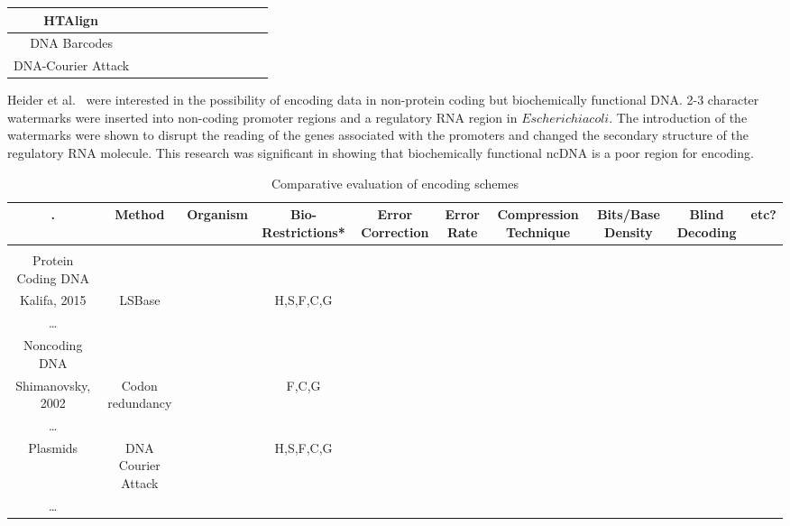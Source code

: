 \documentclass[USenglish,oneside,twocolumn]{article}
\begin{document}
\begin{table}[h]
{\begin{tabular}{|c|c|c|c|c|c|c|c|c|c|c|}
		HTAlign~\cite{HB2011IEEEICOBAB}  &  &  &\centering{$\CIRCLE$}  &\centering{$\CIRCLE$}  &  &\centering{$\Circle$}  &\centering{$\Circle$}  &  &  &\\ \hline
		DNA Barcodes~\cite{KS2015BMCB}  &\centering{$\CIRCLE$}  &  &\centering{$\CIRCLE$}  &\centering{$\CIRCLE$}  &  &\centering{$\CIRCLE$}  &\centering{$\CIRCLE$}  &  &  &\\ \hline
		DNA-Courier Attack~\cite{CLY2015SAPW}  &  &  &\centering{$\CIRCLE$}  &\centering{$\CIRCLE$}  &\centering{$\CIRCLE$}  &  &  &  &\centering{$\CIRCLE$}  &\\ \hline
	\end{tabular}}
\end{table}

Heider et al.~\cite{HPB2009BMCRN} were interested in the possibility of encoding data in non-protein coding but biochemically functional DNA. 2-3 character watermarks were inserted into non-coding promoter regions and a regulatory RNA region in $Escherichia coli$. The introduction of the watermarks were shown to disrupt the reading of the genes associated with the promoters and changed the secondary structure of the regulatory RNA molecule. This research was significant in showing that biochemically functional ncDNA is a poor region for encoding.




\begin{table}[h]
	\caption{Comparative evaluation of encoding schemes}
	\label{fig:encoding_table}
	\centering
	\begin{tabular}{|c|c|c|c|c|c|c|c|c|c|}\hline \hline
		.  &Method  &Organism  &Bio-Restrictions*  &Error Correction  &Error Rate  &Compression Technique  &Bits/Base Density  &Blind Decoding  &etc?\\ \hline
		&  &  &  &  &  &  &  &  &\\ \hline
		Protein Coding DNA  &  &  &  &  &  &  &  &  &\\ \hline
		Kalifa, 2015  &LSBase  &  &H,S,F,C,G  &  &  &  &  &  &\\ \hline
		…  &  &  &  &  &  &  &  &  &\\ \hline
		Noncoding DNA  &  &  &  &  &  &  &  &  &\\ \hline
		Shimanovsky, 2002  &Codon redundancy  &  &F,C,G  &  &  &  &  &  &\\ \hline
		…  &  &  &  &  &  &  &  &  &\\ \hline
		Plasmids  &DNA Courier Attack  &  &H,S,F,C,G  &  &  &  &  &  &\\ \hline
		…  &  &  &  &  &  &  &  &  &\\ \hline
	\end{tabular}
\end{table}
\end{document}

